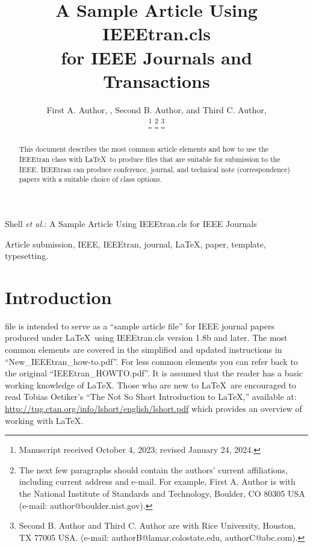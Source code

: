 \documentclass[journal,9pt]{IEEEtran}
\begin{document}
\title{A Sample Article Using IEEEtran.cls\\ for IEEE Journals and Transactions}

\author{First A. Author, , Second B. Author, and Third C. Author, 

  \thanks{Manuscript received October 4, 2023; revised January 24, 2024.}
  \thanks{The next few paragraphs should contain
    the authors' current affiliations, including current address and e-mail. For
    example, First A. Author is with the National Institute of Standards and
    Technology, Boulder, CO 80305 USA (e-mail: author@boulder.nist.gov). }
  \thanks{Second B. Author and Third C. Author are with Rice University, Houston, TX 77005 USA. (e-mail: authorB@lamar.colostate.edu, authorC@abc.com).}
}

%
{Shell \MakeLowercase{\textit{et al.}}: A Sample Article Using IEEEtran.cls for IEEE Journals}


\maketitle
\begin{abstract}
  This document describes the most common article elements and how to use the IEEEtran class with \LaTeX \ to produce files that are suitable for submission to the IEEE.  IEEEtran can produce conference, journal, and technical note (correspondence) papers with a suitable choice of class options.
\end{abstract}

\begin{IEEEkeywords}
  Article submission, IEEE, IEEEtran, journal, \LaTeX, paper, template, typesetting.
\end{IEEEkeywords}

\section{Introduction}
 file is intended to serve as a ``sample article file''
for IEEE journal papers produced under \LaTeX\ using
IEEEtran.cls version 1.8b and later. The most common elements are covered in the simplified and updated instructions in ``New\_IEEEtran\_how-to.pdf''. For less common elements you can refer back to the original ``IEEEtran\_HOWTO.pdf''. It is assumed that the reader has a basic working knowledge of \LaTeX. Those who are new to \LaTeX \ are encouraged to read Tobias Oetiker's ``The Not So Short Introduction to \LaTeX ,'' available at: \url{http://tug.ctan.org/info/lshort/english/lshort.pdf} which provides an overview of working with \LaTeX.
\end{document}
